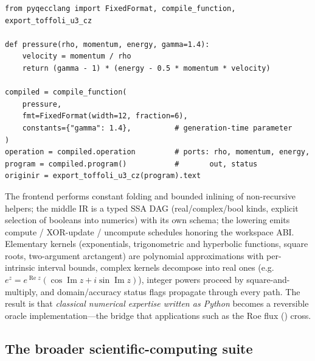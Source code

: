 \begin{lstlisting}[style=pyqpython, caption={Compiling a pure Python numerical function to a reversible module (verbatim from the doctested manual; the gas-dynamics pressure function used by the QFVM pipeline of \secref{sec:casestudies}).  The compiler reads the abstract syntax tree (imports restricted to \texttt{math}/\texttt{cmath}; no execution), folds constants, emits a typed SSA middle IR (MIR~0.1), and lowers to an RIR module with fixed-point ports and propagated status flags.  The calling convention is the XOR-update ABI: inputs preserved, result XOR'd into the \texttt{out} register, domain/overflow state XOR'd into \texttt{status}.}, label={lst:mathfunc}]
from pyqecclang import FixedFormat, compile_function, export_toffoli_u3_cz

def pressure(rho, momentum, energy, gamma=1.4):
    velocity = momentum / rho
    return (gamma - 1) * (energy - 0.5 * momentum * velocity)

compiled = compile_function(
    pressure,
    fmt=FixedFormat(width=12, fraction=6),
    constants={"gamma": 1.4},          # generation-time parameter
)
operation = compiled.operation         # ports: rho, momentum, energy,
program = compiled.program()           #       out, status
originir = export_toffoli_u3_cz(program).text
\end{lstlisting}

The frontend performs constant folding and bounded inlining of non-recursive
helpers; the middle IR is a typed SSA DAG (real/complex/bool kinds, explicit
selection of booleans into numerics) with its own schema; the lowering emits
compute / XOR-update / uncompute schedules honoring the workspace ABI.
Elementary kernels (exponentials, trigonometric and hyperbolic functions,
square roots, two-argument arctangent) are polynomial approximations with
per-intrinsic interval bounds, complex kernels decompose into real ones
(e.g.\ $e^{z} = e^{\operatorname{Re}z}(\cos\operatorname{Im}z +
i\sin\operatorname{Im}z)$), integer powers proceed by square-and-multiply,
and domain/accuracy status flags propagate through every path.  The result
is that \emph{classical numerical expertise written as Python} becomes a
reversible oracle implementation---the bridge that applications such as the
Roe flux () cross.

\subsection{The broader scientific-computing suite}
\label{sec:sc-suite}

